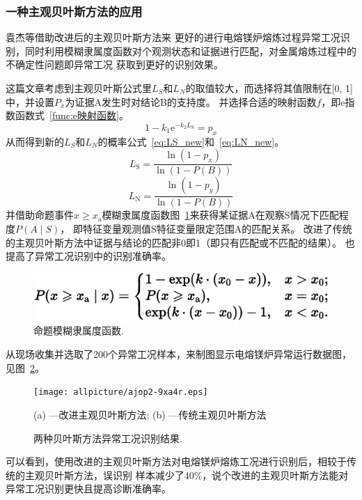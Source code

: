 \documentclass[12pt,a4paper,UTF8]{ctexart}
\begin{document}
\subsubsection{一种主观贝叶斯方法的应用}
袁杰等\cite{YuanJiYuGaiJinZhuGuanBeiYeSiFangFaShiBieDianRongMeiLuYiChangGongKuang2021}借助改进后的主观贝叶斯方法来
更好的进行电熔镁炉熔炼过程异常工况识别，同时利用模糊隶属度函数对个观测状态和证据进行匹配，对金属熔炼过程中的不确定性问题即异常工况
获取到更好的识别效果。

这篇文章考虑到主观贝叶斯公式里$ L_S $和$ L_N $的取值较大，而选择将其值限制在[0, 1]中，并设置$ P_x $为证据A发生时对结论B的支持度。
并选择合适的映射函数$ f $，即e指数函数式~\ref{func:e映射函数}。
\begin{equation}
    \label{func:e映射函数}
    1-k_1 \mathrm{e}^{-k_2 L_{\mathrm{S}}}=p_x
\end{equation}
从而得到新的$ L_S $和$ L_N $的概率公式~\ref{eq:LS_new}和~\ref{eq:LN_new}。
\begin{equation}
    \label{eq:LS_new}
    L_{\mathrm{S}}=\frac{\ln \left(1-p_x\right)}{\ln (1-P(B))}
\end{equation}
\begin{equation}
    \label{eq:LN_new}
    L_{\mathrm{N}}=\frac{\ln \left(1-p_y\right)}{\ln (1-P(B))}
\end{equation}
并借助命题事件$ x \geq x_{\mathrm{a}} $模糊隶属度函数图~\ref{fig:模糊隶属度函数}来获得某证据A在观察S情况下匹配程度$ P(A \mid S) $，
即特征变量观测值S特征变量限定范围A的匹配关系。
改进了传统的主观贝叶斯方法中证据与结论的匹配非0即1（即只有匹配或不匹配的结果）。
也提高了异常工况识别中的识别准确率。
\begin{figure}[htbp]
    \centering
    \includegraphics[width=12cm]{allpicture/a8ls3-uktor.eps}
    \caption{命题模糊隶属度函数.}
    \label{fig:模糊隶属度函数}
\end{figure}

从现场收集并选取了200个异常工况样本，来制图显示电熔镁炉异常运行数据图，见图~\ref{fig:贝叶斯方法结果}。
\begin{figure}[htbp]
    \centering
    \texttt{[image: allpicture/ajop2-9xa4r.eps]}
    \caption{两种贝叶斯方法异常工况识别结果.}
    {(a) —改进主观贝叶斯方法; (b) —传统主观贝叶斯方法}
    \label{fig:贝叶斯方法结果}
\end{figure}
可以看到，使用改进的主观贝叶斯方法对电熔镁炉熔炼工况进行识别后，相较于传统的主观贝叶斯方法，误识别
样本减少了40\%，说个改进的主观贝叶斯方法能对异常工况识别更快且提高诊断准确率\cite{YuanJiYuGaiJinZhuGuanBeiYeSiFangFaShiBieDianRongMeiLuYiChangGongKuang2021}。
\end{document}
